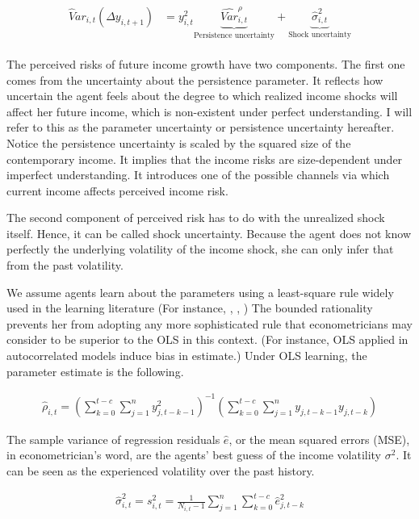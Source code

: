\documentclass[12pt,notitlepage,onecolumn,aps,pra]{article}
\begin{document}
\begin{eqnarray}
\begin{split}
\widehat Var_{i,t}(\Delta y_{i,t+1}) & = y_{i,t}^2 \underbrace{\widehat{Var}^{\rho}_{i,t}}_{\text{Persistence uncertainty}} + \underbrace{\hat{\sigma}^2_{i,t}}_{\text{Shock uncertainty}}
\end{split}
\end{eqnarray}

The perceived risks of future income growth have two components. The
first one comes from the uncertainty about the persistence parameter. It
reflects how uncertain the agent feels about the degree to which
realized income shocks will affect her future income, which is
non-existent under perfect understanding. I will refer to this as the
parameter uncertainty or persistence uncertainty hereafter. Notice the
persistence uncertainty is scaled by the squared size of the
contemporary income. It implies that the income risks are size-dependent
under imperfect understanding. It introduces one of the possible
channels via which current income affects perceived income risk.

The second component of perceived risk has to do with the unrealized
shock itself. Hence, it can be called shock uncertainty. Because the
agent does not know perfectly the underlying volatility of the income
shock, she can only infer that from the past volatility.

We assume agents learn about the parameters using a least-square rule
widely used in the learning literature (For instance,
\cite{marcet1989convergence}, \cite{evans2012learning},
\cite{malmendier2015learning}) The bounded rationality prevents her from
adopting any more sophisticated rule that econometricians may consider
to be superior to the OLS in this context. (For instance, OLS applied in
autocorrelated models induce bias in estimate.) Under OLS learning, the
parameter estimate is the following.

\begin{eqnarray}
\hat \rho_{i,t} = (\sum^{t-c}_{k=0}\sum^{n}_{j=1}y^2_{j,t-k-1})^{-1}(\sum^{t-c}_{k=0}\sum^{n}_{j=1}y_{j,t-k-1}y_{j,t-k})
\end{eqnarray}

The sample variance of regression residuals \(\widehat e\), or the mean
squared errors (MSE), in econometrician's word, are the agents' best
guess of the income volatility \(\sigma^2\). It can be seen as the
experienced volatility over the past history.

\begin{eqnarray}
\widehat{\sigma}^2_{i,t} = s^2_{i,t} = \frac{1}{N_{i,t}-1} \sum^{n}_{j=1}\sum^{t-c}_{k=0} \hat e_{j,t-k}^2
\end{eqnarray}
\end{document}
